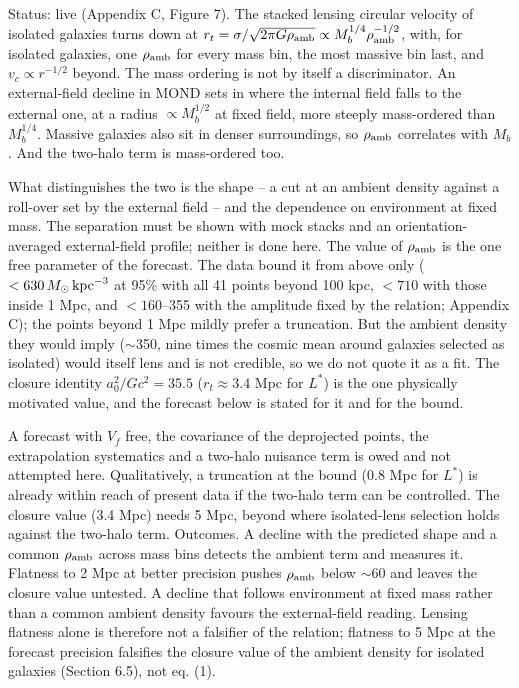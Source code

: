 \documentclass[
  10pt,
]{article}
\begin{document}
Status: live (Appendix C, Figure 7). The stacked lensing circular velocity of isolated galaxies turns down at $r_t=\sigma/\sqrt{2\pi G\rho_{\rm amb}}\propto M_b^{1/4}\rho_{\rm amb}^{-1/2}$, with, for isolated galaxies, one $\rho_{\rm amb}$ for every mass bin, the most massive bin last, and $v_c\propto r^{-1/2}$ beyond. The mass ordering is not by itself a discriminator. An external-field decline in MOND sets in where the internal field falls to the external one, at a radius $\propto M_b^{1/2}$ at fixed field, more steeply mass-ordered than $M_b^{1/4}$. Massive galaxies also sit in denser surroundings, so $\rho_{\rm amb}$ correlates with $M_b$. And the two-halo term is mass-ordered too.

What distinguishes the two is the shape -- a cut at an ambient density against a roll-over set by the external field -- and the dependence on environment at fixed mass. The separation must be shown with mock stacks and an orientation-averaged external-field profile; neither is done here. The value of $\rho_{\rm amb}$ is the one free parameter of the forecast. The data bound it from above only ($<630\,M_\odot\,{\rm kpc}^{-3}$ at 95\% with all 41 points beyond 100 kpc, $<710$ with those inside 1 Mpc, and $<160$--355 with the amplitude fixed by the relation; Appendix C); the points beyond 1 Mpc mildly prefer a truncation. But the ambient density they would imply ($\sim$350, nine times the cosmic mean around galaxies selected as isolated) would itself lens and is not credible, so we do not quote it as a fit. The closure identity $a_0^2/Gc^2=35.5$ ($r_t\approx3.4$ Mpc for $L^*$) is the one physically motivated value, and the forecast below is stated for it and for the bound.

A forecast with $V_f$ free, the covariance of the deprojected points, the extrapolation systematics and a two-halo nuisance term is owed and not attempted here. Qualitatively, a truncation at the bound (0.8 Mpc for $L^*$) is already within reach of present data if the two-halo term can be controlled. The closure value (3.4 Mpc) needs 5 Mpc, beyond where isolated-lens selection holds against the two-halo term. Outcomes. A decline with the predicted shape and a common $\rho_{\rm amb}$ across mass bins detects the ambient term and measures it. Flatness to 2 Mpc at better precision pushes $\rho_{\rm amb}$ below $\sim$60 and leaves the closure value untested. A decline that follows environment at fixed mass rather than a common ambient density favours the external-field reading. Lensing flatness alone is therefore not a falsifier of the relation; flatness to 5 Mpc at the forecast precision falsifies the closure value of the ambient density for isolated galaxies (Section 6.5), not eq. (1).
\end{document}
